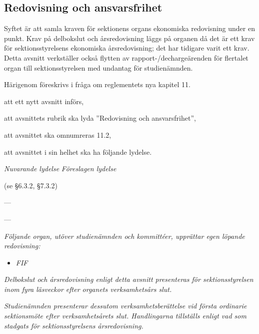 \documentclass{article}
\newenvironment{lydelse}
    {\begin{paracol}{2}%
        \emph{Nuvarande lydelse}%
        \switchcolumn%
        \emph{Föreslagen lydelse}%
    \end{paracol}%
    \begin{enumerate}[label=\thesubsection.\arabic*]%
    \begin{paracol}{2}%
    }{\end{paracol}\end{enumerate}}
\begin{document}
\subsection{Redovisning och ansvarsfrihet}
Syftet är att samla kraven för sektionens organs ekonomiska redovisning under en punkt.
Krav på delbokslut och årsredovisning läggs på organen då det är ett krav för sektionsstyrelsens ekonomiska årsredovisning; det har tidigare varit ett krav.
Detta avsnitt verkställer också flytten av rapport-/dechargeärenden för flertalet organ till sektionsstyrelsen med undantag för studienämnden.

Härigenom föreskrivs i fråga om reglementets nya kapitel 11.

\begin{dels}
    \item att ett nytt avsnitt införs,
    \item att avsnittets rubrik ska lyda ''Redovisning och ansvarsfrihet'',
    \item att avsnittet ska omnumreras 11.2,
    \item att avsnittet i sin helhet ska ha följande lydelse.
\end{dels}
\begin{lydelse}
    
    \item[] (se \S6.3.2, \S7.3.2)
    
    \vspace{3em}
    \item[] ---
    
    \vspace{2.2em}
    \item[] ---
    
    \switchcolumn
  
   \item \emph{Följande organ, utöver studienämnden och kommittéer, upprättar egen löpande redovisning:} \label{R:FIFred}
    \begin{itemize}
        \item \emph{FIF}
    \end{itemize}
    
   \item \emph{Delbokslut och årsredovisning enligt detta avsnitt presenteras för sektionsstyrelsen inom fyra läsveckor efter organets verksamhetsårs slut.}
    
   \item \emph{Studienämnden presenterar dessutom verksamhetsberättelse vid första ordinarie sektionsmöte efter verksamhetsårets slut.
    Handlingarna tillställs enligt vad som stadgats för sektionsstyrelsens årsredovisning.}

\end{lydelse}
\end{document}
